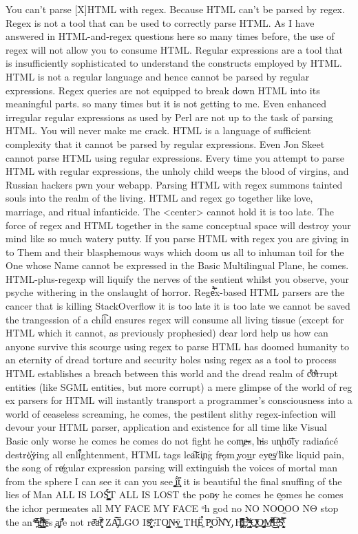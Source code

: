 You can't parse [X]HTML with regex. Because HTML can't be parsed by regex. Regex is not a tool that can be used to correctly parse HTML. As I have answered in HTML-and-regex questions here so many times before, the use of regex will not allow you to consume HTML. Regular expressions are a tool that is insufficiently sophisticated to understand the constructs employed by HTML. HTML is not a regular language and hence cannot be parsed by regular expressions. Regex queries are not equipped to break down HTML into its meaningful parts. so many times but it is not getting to me. Even enhanced irregular regular expressions as used by Perl are not up to the task of parsing HTML. You will never make me crack. HTML is a language of sufficient complexity that it cannot be parsed by regular expressions. Even Jon Skeet cannot parse HTML using regular expressions. Every time you attempt to parse HTML with regular expressions, the unholy child weeps the blood of virgins, and Russian hackers pwn your webapp. Parsing HTML with regex summons tainted souls into the realm of the living. HTML and regex go together like love, marriage, and ritual infanticide. The <center> cannot hold it is too late. The force of regex and HTML together in the same conceptual space will destroy your mind like so much watery putty. If you parse HTML with regex you are giving in to Them and their blasphemous ways which doom us all to inhuman toil for the One whose Name cannot be expressed in the Basic Multilingual Plane, he comes. HTML-plus-regexp will liquify the n​erves of the sentient whilst you observe, your psyche withering in the onslaught of horror. Rege̿̔̉x-based HTML parsers are the cancer that is killing StackOverflow it is too late it is too late we cannot be saved the trangession of a chi͡ld ensures regex will consume all living tissue (except for HTML which it cannot, as previously prophesied) dear lord help us how can anyone survive this scourge using regex to parse HTML has doomed humanity to an eternity of dread torture and security holes using regex as a tool to process HTML establishes a breach between this world and the dread realm of c͒ͪo͛ͫrrupt entities (like SGML entities, but more corrupt) a mere glimpse of the world of reg​ex parsers for HTML will ins​tantly transport a programmer's consciousness into a world of ceaseless screaming, he comes, the pestilent slithy regex-infection wil​l devour your HT​ML parser, application and existence for all time like Visual Basic only worse he comes he comes do not fi​ght he com̡e̶s, ̕h̵i​s un̨ho͞ly radiańcé destro҉ying all enli̍̈́̂̈́ghtenment, HTML tags lea͠ki̧n͘g fr̶ǫm ̡yo​͟ur eye͢s̸ ̛l̕ik͏e liq​uid pain, the song of re̸gular exp​ression parsing will exti​nguish the voices of mor​tal man from the sp​here I can see it can you see ̲͚̖͔̙î̩́t̲͎̩̱͔́̋̀ it is beautiful t​he final snuffing of the lie​s of Man ALL IS LOŚ͖̩͇̗̪̏̈́T ALL I​S LOST the pon̷y he comes he c̶̮omes he comes the ich​or permeates all MY FACE MY FACE ᵒh god no NO NOO̼O​O NΘ stop the an​*̶͑̾̾​̅ͫ͏̙̤g͇̫͛͆̾ͫ̑͆l͖͉̗̩̳̟̍ͫͥͨe̠̅s ͎a̧͈͖r̽̾̈́͒͑e n​ot rè̑ͧ̌aͨl̘̝̙̃ͤ͂̾̆ ZA̡͊͠͝LGΌ ISͮ̂҉̯͈͕̹̘̱ TO͇̹̺ͅƝ̴ȳ̳ TH̘Ë͖́̉ ͠P̯͍̭O̚​N̐Y̡ H̸̡̪̯ͨ͊̽̅̾̎Ȩ̬̩̾͛ͪ̈́̀́͘ ̶̧̨̱̹̭̯ͧ̾ͬC̷̙̲̝͖ͭ̏ͥͮ͟Oͮ͏̮̪̝͍M̲̖͊̒ͪͩͬ̚̚͜Ȇ̴̟̟͙̞ͩ͌͝S̨̥̫͎̭ͯ̿̔̀ͅ
